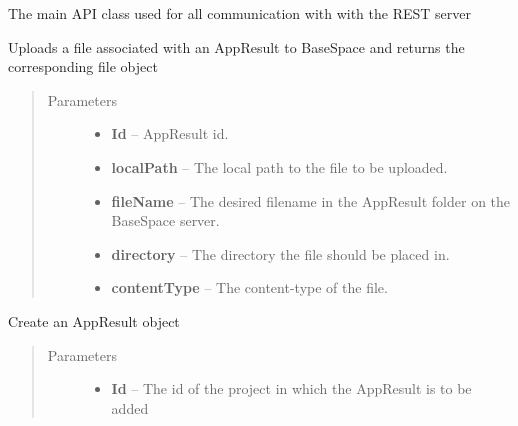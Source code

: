 \documentclass[letterpaper,10pt,english]{sphinxmanual}
\begin{document}
\begin{fulllineitems}
\label{Available modules:BaseSpacePy.api.BaseSpaceAPI.BaseSpaceAPI}
The main API class used for all communication with with the REST server

\begin{fulllineitems}
\label{Available modules:BaseSpacePy.api.BaseSpaceAPI.BaseSpaceAPI.appResultFileUpload}
Uploads a file associated with an AppResult to BaseSpace and returns the corresponding file object
\begin{quote}\begin{description}
\item[{Parameters}] \leavevmode\begin{itemize}
\item {} 
\textbf{Id} -- AppResult id.

\item {} 
\textbf{localPath} -- The local path to the file to be uploaded.

\item {} 
\textbf{fileName} -- The desired filename in the AppResult folder on the BaseSpace server.

\item {} 
\textbf{directory} -- The directory the file should be placed in.

\item {} 
\textbf{contentType} -- The content-type of the file.

\end{itemize}

\end{description}\end{quote}

\end{fulllineitems}


\begin{fulllineitems}
\label{Available modules:BaseSpacePy.api.BaseSpaceAPI.BaseSpaceAPI.createAppResult}
Create an AppResult object
\begin{quote}\begin{description}
\item[{Parameters}] \leavevmode\begin{itemize}
\item {} 
\textbf{Id} -- The id of the project in which the AppResult is to be added


\end{itemize}
\end{description}
\end{quote}
\end{fulllineitems}
\end{fulllineitems}
\end{document}
